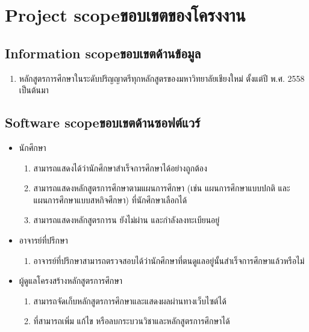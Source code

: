 \section{\ifenglish Project scope\else ขอบเขตของโครงงาน\fi}

\subsection{\ifenglish Information scope\else ขอบเขตด้านข้อมูล\fi}
\begin{enumerate}
    \item หลักสูตรการศึกษาในระดับปริญญาตรีทุกหลักสูตรของมหาวิทยาลัยเชียงใหม่ ตั้งแต่ปี พ.ศ. 2558 เป็นต้นมา 
\end{enumerate}


\subsection{\ifenglish Software scope\else ขอบเขตด้านซอฟต์แวร์\fi}

\begin{itemize}
\item นักศึกษา 

\begin{enumerate}
    \item สามารถแสดงได้ว่านักศึกษาสำเร็จการศึกษาได้อย่างถูกต้อง
    \item สามารถแสดงหลักสูตรการศึกษาตามแผนการศึกษา (เช่น แผนการศึกษาแบบปกติ และ แผนการศึกษาแบบสหกิจศึกษา) ที่นักศึกษาเลือกได้
    \item สามารถแสดงหลักสูตรการน ยังไม่ผ่าน และกำลังลงทะเบียนอยู่ 
\end{enumerate}

\item อาจารย์ที่ปรึกษา 

\begin{enumerate}
    \item อาจารย์ที่ปรึกษาสามารถตรวจสอบได้ว่านักศึกษาที่ตนดูแลอยู่นั้นสำเร็จการศึกษาแล้วหรือไม่
\end{enumerate}

\item ผู้ดูแลโครงสร้างหลักสูตรการศึกษา

\begin{enumerate}
    \item สามารถจัดเก็บหลักสูตรการศึกษาและแสดงผลผ่านทางเว็บไซต์ได้
    \item {}ที่สามารถเพิ่ม แก้ไข หรือลบกระบวนวิชาและหลักสูตรการศึกษาได้
\end{enumerate}
\end{itemize}

